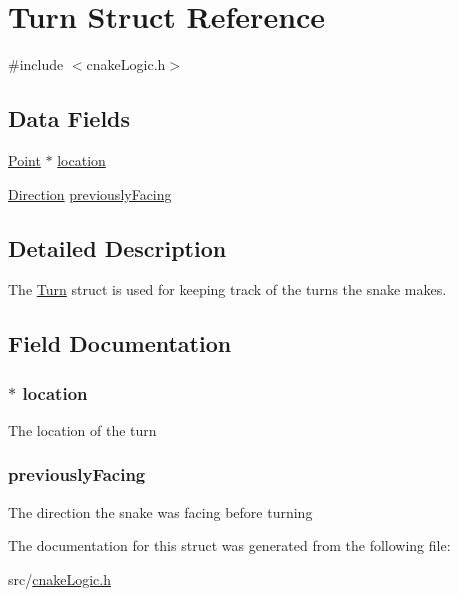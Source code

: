 \hypertarget{struct_turn}{}\section{Turn Struct Reference}
\label{struct_turn}


{\ttfamily \#include $<$cnake\+Logic.\+h$>$}

\subsection*{Data Fields}
\begin{DoxyCompactItemize}
\item 
\hyperlink{struct_point}{Point} $\ast$ \hyperlink{struct_turn_a89408ee02ab1ebdda1bb89dbfd56f7a1}{location}
\item 
\hyperlink{cnake_logic_8h_a224b9163917ac32fc95a60d8c1eec3aa}{Direction} \hyperlink{struct_turn_ae9ae111db1693576cbeba6b699d8d1d2}{previously\+Facing}
\end{DoxyCompactItemize}


\subsection{Detailed Description}
The \hyperlink{struct_turn}{Turn} struct is used for keeping track of the turns the snake makes. 

\subsection{Field Documentation}
\subsubsection[{\texorpdfstring{location}{location}}]{$\ast$ location}\hypertarget{struct_turn_a89408ee02ab1ebdda1bb89dbfd56f7a1}{}\label{struct_turn_a89408ee02ab1ebdda1bb89dbfd56f7a1}
The location of the turn 
\subsubsection[{\texorpdfstring{previously\+Facing}{previouslyFacing}}]{ previously\+Facing}\hypertarget{struct_turn_ae9ae111db1693576cbeba6b699d8d1d2}{}\label{struct_turn_ae9ae111db1693576cbeba6b699d8d1d2}
The direction the snake was facing before turning 

The documentation for this struct was generated from the following file\+:\begin{DoxyCompactItemize}
\item 
src/\hyperlink{cnake_logic_8h}{cnake\+Logic.\+h}\end{DoxyCompactItemize}
